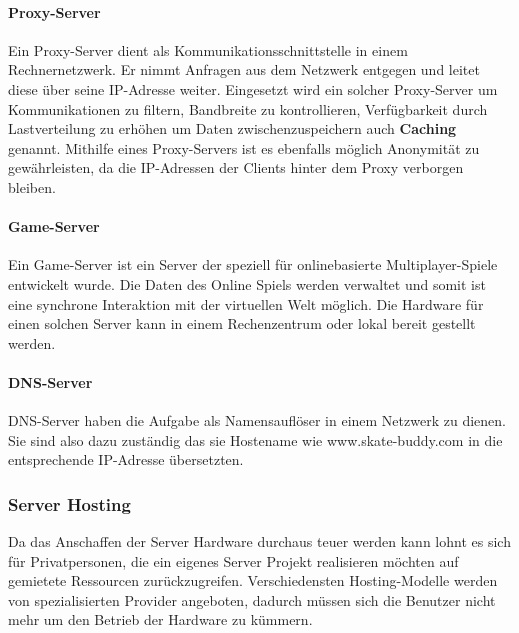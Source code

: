 \paragraph{Proxy-Server}
Ein Proxy-Server dient als Kommunikationsschnittstelle in einem Rechnernetzwerk. Er nimmt Anfragen
aus dem Netzwerk entgegen und leitet diese über seine IP-Adresse weiter. Eingesetzt wird ein solcher
Proxy-Server um Kommunikationen zu filtern, Bandbreite zu kontrollieren, Verfügbarkeit durch
Lastverteilung zu erhöhen um Daten zwischenzuspeichern auch \textbf{Caching} genannt. Mithilfe eines
Proxy-Servers ist es ebenfalls möglich Anonymität zu gewährleisten, da die IP-Adressen der Clients
hinter dem Proxy verborgen bleiben.

\paragraph{Game-Server}
Ein Game-Server ist ein Server der speziell für onlinebasierte Multiplayer-Spiele entwickelt wurde.
Die Daten des Online Spiels werden verwaltet und somit ist eine synchrone Interaktion mit der
virtuellen Welt möglich. Die Hardware für einen solchen Server kann in einem Rechenzentrum oder lokal
bereit gestellt werden.

\paragraph{DNS-Server}
DNS-Server haben die Aufgabe als Namensauflöser in einem Netzwerk zu dienen. Sie sind also dazu
zuständig das sie Hostename wie www.skate-buddy.com in die entsprechende IP-Adresse übersetzten.

\subsubsection{Server Hosting}
Da das Anschaffen der Server Hardware durchaus teuer werden kann lohnt es sich für Privatpersonen,
die ein eigenes Server Projekt realisieren möchten auf gemietete Ressourcen zurückzugreifen.
Verschiedensten Hosting-Modelle werden von spezialisierten Provider angeboten, dadurch müssen sich
die Benutzer nicht mehr um den Betrieb der Hardware zu kümmern.

\cite{Server}



\label{server}